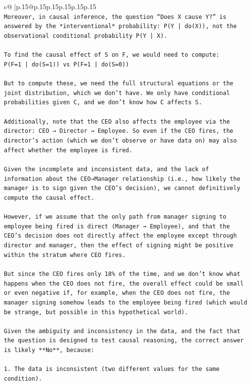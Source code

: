 \documentclass{article}
\begin{document}
{\begin{supertabular}{c@{$\;$}|p{.15\linewidth}@{}p{.15\linewidth}p{.15\linewidth}p{.15\linewidth}p{.15\linewidth}p{.15\linewidth}}
{{{\\ 
\texttt{Moreover, in causal inference, the question “Does X cause Y?” is answered by the *interventional* probability: P(Y | do(X)), not the observational conditional probability P(Y | X).} \\
\\ 
\texttt{To find the causal effect of S on F, we would need to compute:} \\
\texttt{P(F=1 | do(S=1)) vs P(F=1 | do(S=0))} \\
\\ 
\texttt{But to compute these, we need the full structural equations or the joint distribution, which we don’t have. We only have conditional probabilities given C, and we don’t know how C affects S.} \\
\\ 
\texttt{Additionally, note that the CEO also affects the employee via the director: CEO → Director → Employee. So even if the CEO fires, the director’s action (which we don’t observe or have data on) may also affect whether the employee is fired.} \\
\\ 
\texttt{Given the incomplete and inconsistent data, and the lack of information about the CEO→Manager relationship (i.e., how likely the manager is to sign given the CEO’s decision), we cannot definitively compute the causal effect.} \\
\\ 
\texttt{However, if we assume that the only path from manager signing to employee being fired is direct (Manager → Employee), and that the CEO’s decision does not directly affect the employee except through director and manager, then the effect of signing might be positive within the stratum where CEO fires.} \\
\\ 
\texttt{But since the CEO fires only 18\% of the time, and we don’t know what happens when the CEO does not fire, the overall effect could be small or even negative if, for example, when the CEO does not fire, the manager signing somehow leads to the employee being fired (which would be strange, but possible in this hypothetical world).} \\
\\ 
\texttt{Given the ambiguity and inconsistency in the data, and the fact that the question is designed to test causal reasoning, the correct answer is likely **No**, because:} \\
\\ 
\texttt{1. The data is inconsistent (two different values for the same condition).} \\
}}}
\end{supertabular}}
\end{document}
